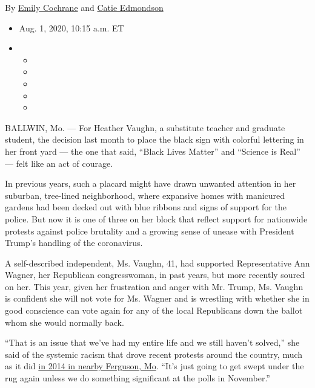 By \href{https://www.nytimes.com/by/emily-cochrane}{Emily Cochrane} and
\href{https://www.nytimes.com/by/catie-edmondson}{Catie Edmondson}

\begin{itemize}
\item
  Aug. 1, 2020, 10:15 a.m. ET
\item
  \begin{itemize}
  \item
  \item
  \item
  \item
  \item
  \end{itemize}
\end{itemize}

BALLWIN, Mo. --- For Heather Vaughn, a substitute teacher and graduate
student, the decision last month to place the black sign with colorful
lettering in her front yard --- the one that said, ``Black Lives
Matter'' and ``Science is Real'' --- felt like an act of courage.

In previous years, such a placard might have drawn unwanted attention in
her suburban, tree-lined neighborhood, where expansive homes with
manicured gardens had been decked out with blue ribbons and signs of
support for the police. But now it is one of three on her block that
reflect support for nationwide protests against police brutality and a
growing sense of unease with President Trump's handling of the
coronavirus.

A self-described independent, Ms. Vaughn, 41, had supported
Representative Ann Wagner, her Republican congresswoman, in past years,
but more recently soured on her. This year, given her frustration and
anger with Mr. Trump, Ms. Vaughn is confident she will not vote for Ms.
Wagner and is wrestling with whether she in good conscience can vote
again for any of the local Republicans down the ballot whom she would
normally back.

``That is an issue that we've had my entire life and we still haven't
solved,'' she said of the systemic racism that drove recent protests
around the country, much as it did
\href{https://www.nytimes.com/interactive/2014/08/13/us/ferguson-missouri-town-under-siege-after-police-shooting.html}{in
2014 in nearby Ferguson, Mo}. ``It's just going to get swept under the
rug again unless we do something significant at the polls in November.''

